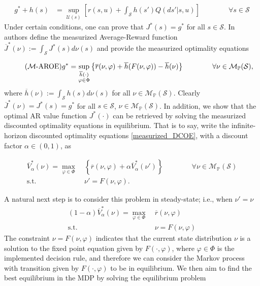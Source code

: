 \documentclass[12pt,a4paper]{article}
\newcommand{\mS}{\mathcal{S}}
\newcommand{\mU}{\mathcal{U}}
\newcommand{\mM}{\mathcal{M}}
\newcommand{\mMpS}{\mathcal{M}_{\mathbb{P}}(\mathcal{S})}
\newcommand{\ovr}{\overline{r}}
\begin{document}
		
		\begin{align}\label{AROE}\tag{AROE}
			g^* +h(s) & = \sup_{\mU(s)} \left[r(s,u) + \int_\mS h(s')Q(ds'|s,u) \right] \qquad \qquad  \forall s \in \mS 
		\end{align}
		Under certain conditions, one can prove that $J^*(s)=g^*$ for all $s \in \mS$. In \cite{measurized} authors define the measurized Average-Reward function $\overline{J}^*(\nu):=\int_\mS J^*(s) d\nu(s)$ and provide the measurized optimality equations
		
		
		\begin{equation} \label{measurized_AROE} \tag{$\mM$-AROE}
			g^*= \sup_{\substack{\overline{h}(\cdot) \\ \varphi \in \Phi}} \left\{ \ovr(\nu,\varphi)+  \overline{h}(F(\nu,\varphi))-\overline{h}(\nu) \right\}  \qquad \qquad \forall \nu \in \mMpS,
		\end{equation}
		where  $\overline{h}(\nu):=\int_\mS h(s) d\nu(s)$ for all $\nu \in \mMpS$. Clearly $ \overline{J}^*(\nu)=J^*(s)=g^*$ for all $s \in \mS$, $\nu \in \mMpS$. In addition, we show that the optimal AR value function $J^*(\cdot)$ can be retrieved by solving the measurized discounted optimality equations in equilibrium. That is to say, write the infinite-horizon discounted optimality equations \eqref{measurized_DCOE}, with a discount factor $\alpha \in (0,1)$, as
		
		\begin{align*}%
			\overline{V}_\alpha^*(\nu)=\max_{\varphi \in \Phi} &\ \left\{ \ovr(\nu,\varphi) + \alpha   \overline{V}_\alpha^*(\nu')\right\}   \qquad \qquad \forall \nu \in \mMpS\\
			\mbox{s.t. } &\ \nu'=F(\nu,\varphi). \nonumber
		\end{align*}
		
		
		A natural next step is to consider this problem in steady-state; i.e., when $\nu'=\nu$
		\begin{align*}%
			(1-\alpha)\overline{V}_\alpha^*(\nu)=\max_{\varphi \in \Phi} &\ \ovr(\nu,\varphi) \\
			\mbox{s.t. } &\ \nu=F(\nu,\varphi) \nonumber
		\end{align*}
		The constraint $\nu=F(\nu,\varphi)$ indicates that the current state distribution $\nu$ is a solution to the fixed point equation given by $F(\cdot,\varphi)$, where $\varphi \in \Phi$ is the implemented decision rule, and therefore we can consider the Markov process with transition given by $F(\cdot,\varphi)$ to be in equilibrium. We then aim to find the best equilibrium in the MDP by solving the equilibrium problem 
		
\end{document}
